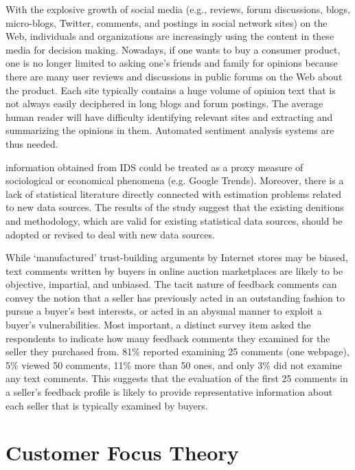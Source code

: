 With the explosive growth of social media (e.g., reviews, forum discussions,
blogs, micro-blogs, Twitter, comments, and postings in social network sites)
on the Web, individuals and organizations are increasingly using the content
in these media for decision making. Nowadays, if one wants to buy a
consumer product, one is no longer limited to asking one’s friends and
family for opinions because there are many user reviews and discussions in
public forums on the Web about the product. 
Each site
typically contains a huge volume of opinion text that is not always easily
deciphered in long blogs and forum postings. The average human reader will
have difficulty identifying relevant sites and extracting and summarizing the
opinions in them. Automated sentiment analysis systems are thus needed.\cite{liu2012sentiment}

information obtained from IDS
could be treated as a proxy measure of sociological or economical phenomena (e.g. Google
Trends). Moreover, there is a lack of statistical literature directly connected with estimation
problems related to new data sources. The results of the study suggest that the existing denitions and methodology, which are
valid for existing statistical data sources, should be adopted or revised to deal with new data
sources. \cite{berkesewicz2015representativeness}

While ‘manufactured’ trust-building arguments by Internet stores may be biased, text comments written by buyers in online auction marketplaces are likely to be objective, impartial, and unbiased. The tacit nature of feedback comments can convey the notion that a seller has previously acted in an outstanding fashion to pursue a buyer’s best interests, or acted in an abysmal manner to exploit a buyer’s vulnerabilities.
Most important, a distinct survey item asked the respondents to indicate how many feedback comments they examined for the seller they purchased from. 81\% reported examining 25 comments (one webpage), 5\% viewed 50 comments, 11\% more than 50 ones, and only 3\% did not examine any text comments. This suggests that the evaluation of the first 25 comments in a seller’s feedback profile is likely to provide representative information about each seller that is typically examined by buyers. \cite{pavlou2006institutional,pavlou2006nature} 
\section{Customer Focus Theory}
\label{sec:CFTH}

